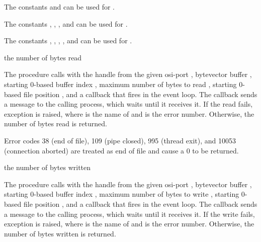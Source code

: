 The constants  and  can
be used for .

The constants , ,
, and  can be
used for .

The constants , ,
, , and
 can be used for
.

\begin{procedure}
\end{procedure}
\returns{} the number of bytes read

The  procedure calls  with
the handle from the given osi-port , bytevector buffer
, starting 0-based buffer index , maximum number of
bytes to read , starting 0-based file position , and a
callback that fires in the event loop. The callback sends a message to
the calling process, which waits until it receives it. If the read
fails, exception 
is raised, where  is the name of  and 
is the error number. Otherwise, the number of bytes read is returned.

Error codes 38 (end of file), 109 (pipe closed), 995 (thread exit),
and 10053 (connection aborted) are treated as end of file and cause a
0 to be returned.

\begin{procedure}
\end{procedure}
\returns{} the number of bytes written

The  procedure calls 
with the handle from the given osi-port , bytevector buffer
, starting 0-based buffer index , maximum number of
bytes to write , starting 0-based file position , and a
callback that fires in the event loop. The callback sends a message to
the calling process, which waits until it receives it. If the write
fails, exception  is raised, where  is the name of 
and  is the error number. Otherwise, the number of bytes
written is returned.

